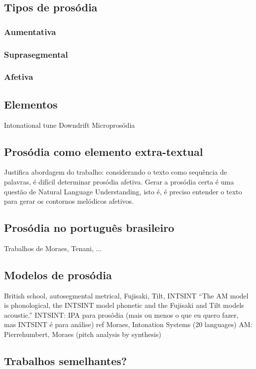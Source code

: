 \subsection{Tipos de prosódia}
\subsubsection{Aumentativa}
\subsubsection{Suprasegmental}
\subsubsection{Afetiva}
\subsection{Elementos}
Intonational tune
Downdrift
Microprosódia
\subsection{Prosódia como elemento extra-textual}
Justifica abordagem do trabalho: considerando o texto como sequência de
palavras, é difícil determinar prosódia afetiva. Gerar a prosódia certa é uma
questão de Natural Language Understanding, isto é, é preciso entender o texto
para gerar os contornos melódicos afetivos.
\subsection{Prosódia no português brasileiro}
Trabalhos de Moraes, Tenani, ...
\subsection{Modelos de prosódia}
British school, autosegmental metrical, Fujisaki, Tilt, INTSINT
``The AM model is phonological, the INTSINT model phonetic and the Fujisaki and Tilt models acoustic.''
INTSINT: IPA para prosódia (mais ou menos o que eu quero fazer, mas INTSINT é
para análise)
ref Moraes, Intonation Systems (20 languages)
AM: Pierrehumbert, Moraes (pitch analysis by synthesis)
\subsection{Trabalhos semelhantes?}


